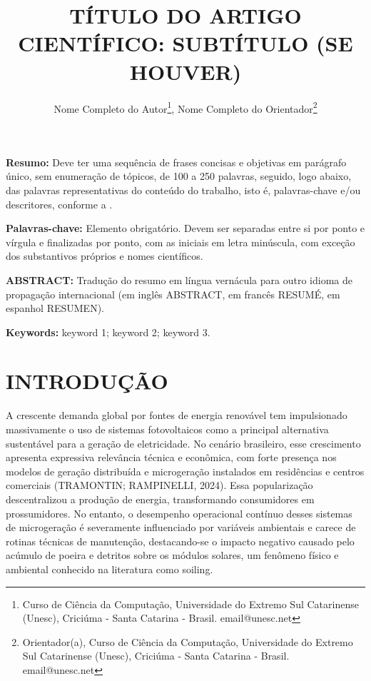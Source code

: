 \documentclass{UNESC}
\title{TÍTULO DO ARTIGO CIENTÍFICO: SUBTÍTULO (SE HOUVER)}
\author
{
   Nome Completo do Autor\footnote{Curso de Ciência da Computação, Universidade do Extremo Sul Catarinense (Unesc), Criciúma - Santa Catarina - Brasil. email@unesc.net},
   Nome Completo do Orientador\footnote{Orientador(a), Curso de Ciência da Computação, Universidade do Extremo Sul Catarinense (Unesc), Criciúma - Santa Catarina - Brasil. email@unesc.net}
}
\begin{document}
\onehalfspacing

\maketitle

\noindent
\textbf{Resumo:} Deve ter uma sequência de frases concisas e objetivas em parágrafo único, sem enumeração de tópicos, de 100 a 250 palavras, seguido, logo abaixo, das palavras representativas do conteúdo do trabalho, isto é, palavras-chave e/ou descritores, conforme a .

\vspace{0.5em}
\noindent
\textbf{Palavras-chave:} Elemento obrigatório. Devem ser separadas entre si por ponto e vírgula e finalizadas por ponto, com as iniciais em letra minúscula, com exceção dos substantivos próprios e nomes científicos. 

\vspace{1.0em}
\noindent
\textbf{ABSTRACT:} Tradução do resumo em língua vernácula para outro idioma de propagação internacional (em inglês ABSTRACT, em francês RESUMÉ, em espanhol RESUMEN).

\vspace{0.5em}
\noindent
\textbf{Keywords:} keyword 1; keyword 2; keyword 3.


\section{INTRODUÇÃO}
A crescente demanda global por fontes de energia renovável tem impulsionado massivamente o uso de sistemas fotovoltaicos como a principal alternativa sustentável para a geração de eletricidade. No cenário brasileiro, esse crescimento apresenta expressiva relevância técnica e econômica, com forte presença nos modelos de geração distribuída e microgeração instalados em residências e centros comerciais (TRAMONTIN; RAMPINELLI, 2024). Essa popularização descentralizou a produção de energia, transformando consumidores em prossumidores. No entanto, o desempenho operacional contínuo desses sistemas de microgeração é severamente influenciado por variáveis ambientais e carece de rotinas técnicas de manutenção, destacando-se o impacto negativo causado pelo acúmulo de poeira e detritos sobre os módulos solares, um fenômeno físico e ambiental conhecido na literatura como soiling.
\end{document}
